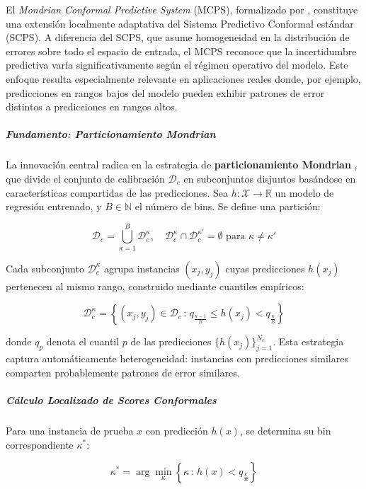 El \textit{Mondrian Conformal Predictive System} (MCPS), formalizado por \textcite{Bostrom2021}, constituye una extensión localmente adaptativa del Sistema Predictivo Conformal estándar (SCPS). A diferencia del SCPS, que asume homogeneidad en la distribución de errores sobre todo el espacio de entrada, el MCPS reconoce que la incertidumbre predictiva varía significativamente según el régimen operativo del modelo. Este enfoque resulta especialmente relevante en aplicaciones reales donde, por ejemplo, predicciones en rangos bajos del modelo pueden exhibir patrones de error distintos a predicciones en rangos altos.

\subparagraph{Fundamento: Particionamiento Mondrian}

La innovación central radica en la estrategia de \textbf{particionamiento Mondrian} \parencite{Vovk2005}, que divide el conjunto de calibración $\mathcal{D}_c$ en subconjuntos disjuntos basándose en características compartidas de las predicciones. Sea $h: \mathcal{X} \rightarrow \mathbb{R}$ un modelo de regresión entrenado, y $B \in \mathbb{N}$ el número de bins. Se define una partición:

\begin{equation}
\mathcal{D}_c = \bigcup_{\kappa=1}^{B} \mathcal{D}_c^{\kappa}, \quad \mathcal{D}_c^{\kappa} \cap \mathcal{D}_c^{\kappa'} = \emptyset \text{ para } \kappa \neq \kappa'
\end{equation}

Cada subconjunto $\mathcal{D}_c^{\kappa}$ agrupa instancias $(x_j, y_j)$ cuyas predicciones $h(x_j)$ pertenecen al mismo rango, construido mediante cuantiles empíricos:

\begin{equation}
\mathcal{D}_c^{\kappa} = \left\{ (x_j, y_j) \in \mathcal{D}_c \,:\, q_{\frac{\kappa-1}{B}} \leq h(x_j) < q_{\frac{\kappa}{B}} \right\}
\end{equation}

donde $q_p$ denota el cuantil $p$ de las predicciones $\{h(x_j)\}_{j=1}^{N_c}$. Esta estrategia captura automáticamente heterogeneidad: instancias con predicciones similares comparten probablemente patrones de error similares.

\subparagraph{Cálculo Localizado de Scores Conformales}

Para una instancia de prueba $x$ con predicción $h(x)$, se determina su bin correspondiente $\kappa^*$:

\begin{equation}
\kappa^* = \arg\min_{\kappa} \left\{ \kappa \,:\, h(x) < q_{\frac{\kappa}{B}} \right\}
\end{equation}

